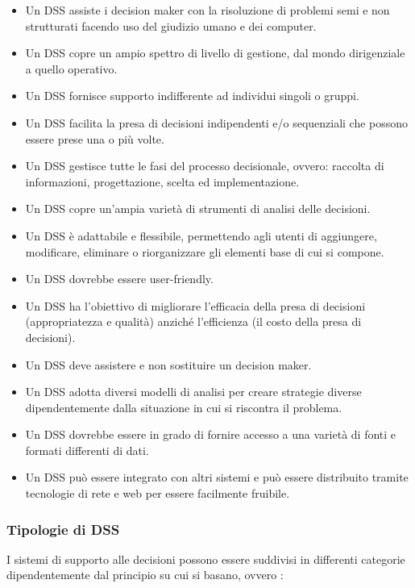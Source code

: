 \begin{itemize}
    \item Un DSS assiste i decision maker con la risoluzione di problemi semi e non strutturati facendo uso del giudizio umano e dei computer.
    \item Un DSS copre un ampio spettro di livello di gestione, dal mondo dirigenziale a quello operativo.
    \item Un DSS fornisce supporto indifferente ad individui singoli o gruppi.
    \item Un DSS facilita la presa di decisioni indipendenti e/o sequenziali che possono essere prese una o più volte.
    \item Un DSS gestisce tutte le fasi del processo decisionale, ovvero: raccolta di informazioni, progettazione, scelta ed implementazione.
    \item Un DSS copre un'ampia varietà di strumenti di analisi delle decisioni.
    \item Un DSS è adattabile e flessibile, permettendo agli utenti di aggiungere, modificare, eliminare o riorganizzare gli elementi base di cui si compone.
    \item Un DSS dovrebbe essere user-friendly.
    \item Un DSS ha l'obiettivo di migliorare l'efficacia della presa di decisioni (appropriatezza e qualità) anziché l'efficienza (il costo della presa di decisioni).
    \item Un DSS deve assistere e non sostituire un decision maker.
    \item Un DSS adotta diversi modelli di analisi per creare strategie diverse dipendentemente dalla situazione in cui si riscontra il problema.
    \item Un DSS dovrebbe essere in grado di fornire accesso a una varietà di fonti e formati differenti di dati.
    \item Un DSS può essere integrato con altri sistemi e può essere distribuito tramite tecnologie di rete e web per essere facilmente fruibile.
\end{itemize}

\subsubsection{Tipologie di DSS}

I sistemi di supporto alle decisioni possono essere suddivisi in differenti categorie dipendentemente dal principio su cui si basano, ovvero \cite{techtarget_dss_types}:

